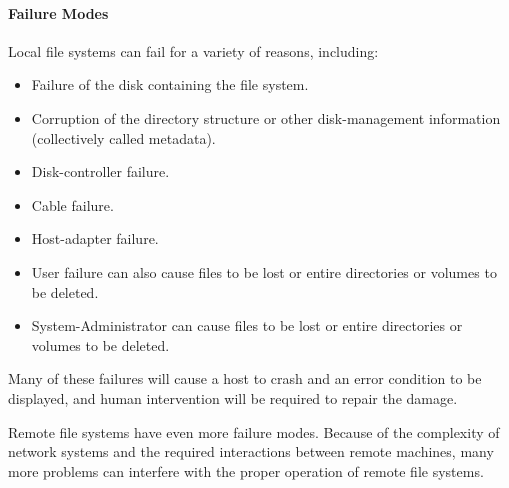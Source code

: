 \paragraph{Failure Modes}\label{par:Failure_Modes}
Local file systems can fail for a variety of reasons, including:
\begin{itemize}[noitemsep]
\item Failure of the disk containing the file system.
\item Corruption of the directory structure or other disk-management information (collectively called metadata).
\item Disk-controller failure.
\item Cable failure.
\item Host-adapter failure.
\item User failure can also cause files to be lost or entire directories or volumes to be deleted.
\item System-Administrator can cause files to be lost or entire directories or volumes to be deleted.
\end{itemize}

Many of these failures will cause a host to crash and an error condition to be displayed, and human intervention will be required to repair the damage.

Remote file systems have even more failure modes.
Because of the complexity of network systems and the required interactions between remote machines, many more problems can interfere with the proper operation of remote file systems.


